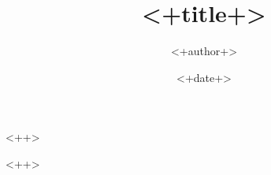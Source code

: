 \documentclass[b4paper,twocolumn,landscape,fontset = windows]{ctexart}
\title{<+title+>}
\author{<+author+>}
\date{<+date+>}
\begin{document}
<++>

<++>
\end{document}
